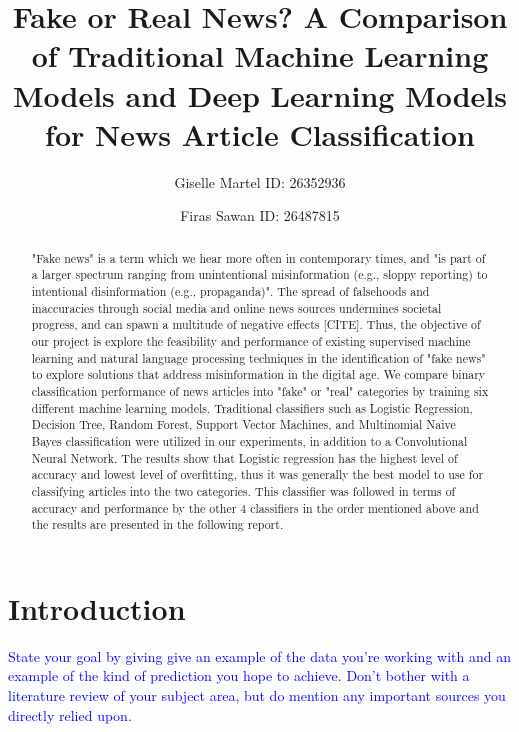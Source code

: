 \documentclass[10pt,twocolumn,letterpaper]{article}
\begin{document}
\title{Fake or Real News? A Comparison of Traditional Machine Learning Models and Deep Learning Models for News Article Classification}
\author{Giselle Martel ID: 26352936 \and Firas Sawan ID: 26487815}
\maketitle

\begin{abstract}
   "Fake news" is a term which we hear more often in contemporary times, and "is part of a larger spectrum ranging from unintentional misinformation (e.g., sloppy reporting) to intentional disinformation (e.g., propaganda)"\cite{doi:https://doi.org/10.1002/9781118841570.iejs0128}. The spread of falsehoods and inaccuracies through social media and online news sources undermines societal progress, and can spawn a multitude of negative effects [CITE]. Thus, the objective of our project is explore the feasibility and performance of existing supervised machine learning and natural language processing techniques in the identification of "fake news" to explore solutions that address misinformation in the digital age. We compare binary classification performance of news articles into "fake" or "real" categories by training six different machine learning models. Traditional classifiers such as Logistic Regression, Decision Tree, Random Forest, Support Vector Machines, and Multinomial Naive Bayes classification were utilized in our experiments, in addition to a Convolutional Neural Network. The results show that Logistic regression has the highest level of accuracy and lowest level of overfitting, thus it was generally the best model to use for classifying articles into the two categories. This classifier was followed in terms of accuracy and performance by the other 4 classifiers in the order mentioned above and the results are presented in the following report. 
\end{abstract} 

\section{Introduction}
\textcolor{blue}{State your goal by giving give an example of the data you're working with and an example of the kind of prediction you hope to achieve. Don't bother with a literature review of your subject area, but do mention any important sources you directly relied upon.}\\
\end{document}
